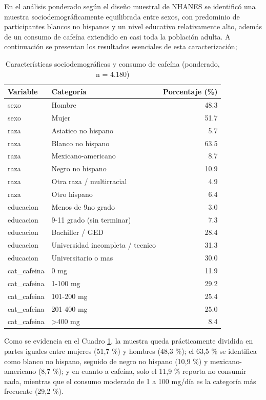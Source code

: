 \documentclass[
  spanish,
  12pt,
]{article}
\begin{document}
En el análisis ponderado según el diseño muestral de NHANES se
identificó una muestra sociodemográficamente equilibrada entre sexos,
con predominio de participantes blancos no hispanos y un nivel
educativo relativamente alto, además de un consumo de cafeína
extendido en casi toda la población adulta. A continuación se presentan
los resultados esenciales de esta caracterización;

\begin{table}

\caption{\label{tab:resultados-tabla1}Características sociodemográficas y consumo de cafeína (ponderado, n = 4.180)}
\centering
\begin{tabular}[t]{l|l|r}
\hline
Variable & Categoría & Porcentaje (\%)\\
\hline
sexo & Hombre & 48.3\\
\hline
sexo & Mujer & 51.7\\
\hline
raza & Asiatico no hispano & 5.7\\
\hline
raza & Blanco no hispano & 63.5\\
\hline
raza & Mexicano-americano & 8.7\\
\hline
raza & Negro no hispano & 10.9\\
\hline
raza & Otra raza / multirracial & 4.9\\
\hline
raza & Otro hispano & 6.4\\
\hline
educacion & Menos de 9no grado & 3.0\\
\hline
educacion & 9-11 grado (sin terminar) & 7.3\\
\hline
educacion & Bachiller / GED & 28.4\\
\hline
educacion & Universidad incompleta / tecnico & 31.3\\
\hline
educacion & Universitario o mas & 30.0\\
\hline
cat\_cafeina & 0 mg & 11.9\\
\hline
cat\_cafeina & 1-100 mg & 29.2\\
\hline
cat\_cafeina & 101-200 mg & 25.4\\
\hline
cat\_cafeina & 201-400 mg & 25.0\\
\hline
cat\_cafeina & >400 mg & 8.4\\
\hline
\end{tabular}
\end{table}

Como se evidencia en el Cuadro \ref{tab:resultados-tabla1}, la muestra
queda prácticamente
dividida en partes iguales entre mujeres (51,7 \%) y hombres (48,3 \%);
el 63,5 \% se identifica como blanco no hispano, seguido de negro no
hispano (10,9 \%) y mexicano-americano (8,7 \%); y en cuanto a cafeína,
solo el 11,9 \% reporta no consumir nada, mientras que el consumo
moderado de 1 a 100 mg/día es la categoría más frecuente (29,2 \%).
\end{document}
